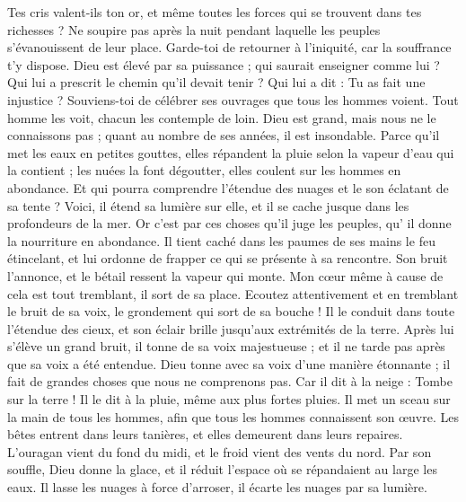 \begin{multicols}{2}
Tes cris valent-ils ton or, et même toutes les forces qui se trouvent dans tes richesses ?
Ne soupire pas après la nuit pendant laquelle les peuples s'évanouissent de leur place.
Garde-toi de retourner à l'iniquité, car la souffrance t'y dispose.
Dieu est élevé par sa puissance ; qui saurait enseigner comme lui ?
Qui lui a prescrit le chemin qu'il devait tenir ? Qui lui a dit : Tu as fait une injustice ?
Souviens-toi de célébrer ses ouvrages que tous les hommes voient.
Tout homme les voit, chacun les contemple de loin.
Dieu est grand, mais nous ne le connaissons pas ; quant au nombre de ses années, il est insondable.
Parce qu'il met les eaux en petites gouttes, elles répandent la pluie selon la vapeur d'eau qui la contient ;
les nuées la font dégoutter, elles coulent sur les hommes en abondance.
Et qui pourra comprendre l'étendue des nuages et le son éclatant de sa tente ?
Voici, il étend sa lumière sur elle, et il se cache jusque dans les profondeurs de la mer.
 Or c'est par ces choses qu'il juge les peuples, qu' il donne la nourriture en abondance.
 Il tient caché dans les paumes de ses mains le feu étincelant, et lui ordonne de frapper ce qui se présente à sa rencontre.
 Son bruit l'annonce, et le bétail ressent la vapeur qui monte.
\VerseOne{}Mon cœur même à cause de cela est tout tremblant, il sort de sa place.
Ecoutez attentivement et en tremblant le bruit de sa voix, le grondement qui sort de sa bouche !
Il le conduit dans toute l'étendue des cieux, et son éclair brille jusqu'aux extrémités de la terre.
Après lui s'élève un grand bruit, il tonne de sa voix majestueuse ; et il ne tarde pas après que sa voix a été entendue.
Dieu tonne avec sa voix d'une manière étonnante ; il fait de grandes choses que nous ne comprenons pas.
Car il dit à la neige : Tombe sur la terre ! Il le dit à la pluie, même aux plus fortes pluies.
Il met un sceau sur la main de tous les hommes, afin que tous les hommes connaissent son œuvre.
Les bêtes entrent dans leurs tanières, et elles demeurent dans leurs repaires.
L'ouragan vient du fond du midi, et le froid vient des vents du nord.
Par son souffle, Dieu donne la glace, et il réduit l'espace où se répandaient au large les eaux.
Il lasse les nuages à force d'arroser, il écarte les nuages par sa lumière.

\end{multicols}
